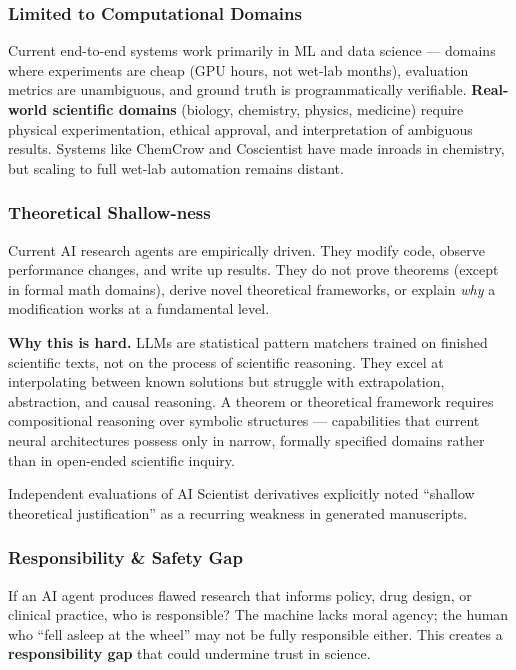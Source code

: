 \documentclass[11pt,a4paper]{article}
\begin{document}
\subsubsection{Limited to Computational Domains}

Current end-to-end systems work primarily in ML and data science --- domains where experiments are cheap (GPU hours, not wet-lab months), evaluation metrics are unambiguous, and ground truth is programmatically verifiable. \textbf{Real-world scientific domains} (biology, chemistry, physics, medicine) require physical experimentation, ethical approval, and interpretation of ambiguous results. Systems like ChemCrow and Coscientist have made inroads in chemistry, but scaling to full wet-lab automation remains distant.

\subsubsection{Theoretical Shallow-ness}

Current AI research agents are empirically driven. They modify code, observe performance changes, and write up results. They do not prove theorems (except in formal math domains), derive novel theoretical frameworks, or explain \textit{why} a modification works at a fundamental level.

\textbf{Why this is hard.} LLMs are statistical pattern matchers trained on finished scientific texts, not on the process of scientific reasoning. They excel at interpolating between known solutions but struggle with extrapolation, abstraction, and causal reasoning. A theorem or theoretical framework requires compositional reasoning over symbolic structures --- capabilities that current neural architectures possess only in narrow, formally specified domains rather than in open-ended scientific inquiry.

Independent evaluations of AI Scientist derivatives explicitly noted ``shallow theoretical justification'' as a recurring weakness in generated manuscripts.

\subsubsection{Responsibility \& Safety Gap}

If an AI agent produces flawed research that informs policy, drug design, or clinical practice, who is responsible? The machine lacks moral agency; the human who ``fell asleep at the wheel'' may not be fully responsible either. This creates a \textbf{responsibility gap} that could undermine trust in science.
\end{document}
